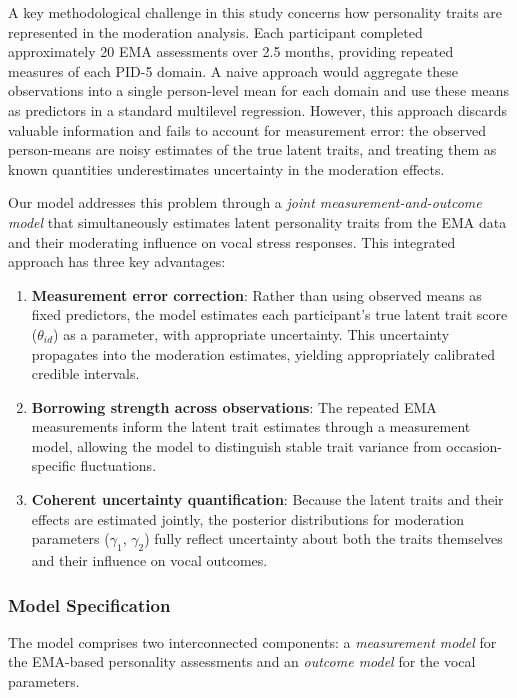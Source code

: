 \documentclass[
  english,
  man,floatsintext]{apa6}
\begin{document}
A key methodological challenge in this study concerns how personality traits are represented in the moderation analysis. Each participant completed approximately 20 EMA assessments over 2.5 months, providing repeated measures of each PID-5 domain. A naive approach would aggregate these observations into a single person-level mean for each domain and use these means as predictors in a standard multilevel regression. However, this approach discards valuable information and fails to account for measurement error: the observed person-means are noisy estimates of the true latent traits, and treating them as known quantities underestimates uncertainty in the moderation effects.

Our model addresses this problem through a \emph{joint measurement-and-outcome model} that simultaneously estimates latent personality traits from the EMA data and their moderating influence on vocal stress responses. This integrated approach has three key advantages:

\begin{enumerate}
\def\labelenumi{\arabic{enumi}.}
\item
  \textbf{Measurement error correction}: Rather than using observed means as fixed predictors, the model estimates each participant's true latent trait score (\(\theta_{id}\)) as a parameter, with appropriate uncertainty. This uncertainty propagates into the moderation estimates, yielding appropriately calibrated credible intervals.
\item
  \textbf{Borrowing strength across observations}: The repeated EMA measurements inform the latent trait estimates through a measurement model, allowing the model to distinguish stable trait variance from occasion-specific fluctuations.
\item
  \textbf{Coherent uncertainty quantification}: Because the latent traits and their effects are estimated jointly, the posterior distributions for moderation parameters (\(\gamma_1\), \(\gamma_2\)) fully reflect uncertainty about both the traits themselves and their influence on vocal outcomes.
\end{enumerate}

\subsubsection{Model Specification}\label{model-specification-1}

The model comprises two interconnected components: a \emph{measurement model} for the EMA-based personality assessments and an \emph{outcome model} for the vocal parameters.
\end{document}
